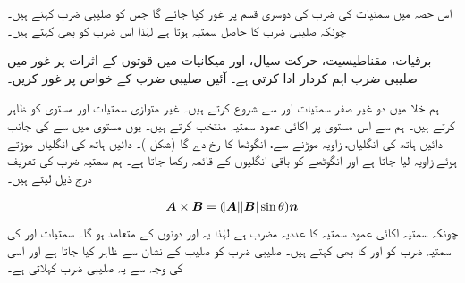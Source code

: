 

اس حصہ میں سمتیات کی ضرب کی دوسری قسم پر غور کیا جائے گا جس کو صلیبی ضرب کہتے ہیں۔ چونکہ صلیبی ضرب کا حاصل سمتیہ ہوتا ہے لہٰذا اس ضرب کو  بھی کہتے ہیں۔

برقیات، مقناطیسیت، حرکت سیال،  اور میکانیات میں قوتوں کے اثرات پر غور میں صلیبی ضرب اہم کردار ادا کرتی ہے۔ آئیں صلیبی ضرب کے خواص پر غور کریں۔ 

ہم خلا میں دو غیر صفر سمتیات  اور  سے شروع کرتے ہیں۔ غیر متوازی سمتیات  اور  مستوی کو ظاہر کرتے ہیں۔ ہم  سے اس مستوی پر اکائی عمود سمتیہ  منتخب کرتے ہیں۔ یوں مستوی میں   سے  کی جانب دائیں ہاتھ کی انگلیاں، زاویہ   موڑنے سے،  انگوٹھا   کا رخ دے گا (شکل )۔ دائیں ہاتھ کی انگلیاں موڑتے ہوئے زاویہ  لیا جاتا ہے اور انگوٹھے کو باقی انگلیوں کے قائمہ رکھا جاتا ہے۔ ہم سمتیہ ضرب  کی تعریف درج ذیل لیتے ہیں۔

\begin{align}\label{مساوات_سمتیہ_تعریف_سمتی_ضرب}
{\ensuremath{{\boldsymbol{A}}}}\times{\ensuremath{{\boldsymbol{B}}}}=(\abs{{{\boldsymbol{A}}}}\abs{{{\boldsymbol{B}}}}\sin\theta){{\boldsymbol{n}}}
\end{align}
چونکہ سمتیہ  اکائی عمود سمتیہ  کا عددیہ مضرب ہے لہٰذا یہ  اور  دونوں کے متعامد ہو گا۔ سمتیات  اور  کی  سمتیہ ضرب کو   اور  کا  بھی  کہتے ہیں۔ صلیبی ضرب کو صلیب کے نشان  سے ظاہر کیا جاتا ہے اور اسی کی وجہ سے یہ صلیبی ضرب کہلاتی ہے۔

